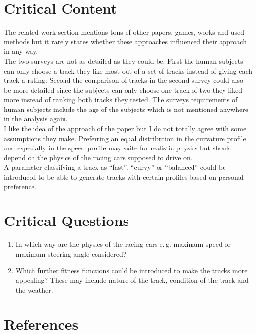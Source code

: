 \documentclass[oneside, notitlepage, twocolumn]{scrartcl}
\newcommand{\eg}{e.\,g. }
\begin{document}
\section{Critical Content}
The related work section mentions tons of other papers, games, works and used methods but it rarely states whether these approaches influenced their approach in any way.\\
The two surveys are not as detailed as they could be.
First the human subjects can only choose a track they like most out of a set of tracks instead of giving each track a rating.
Second the comparison of tracks in the second survey could also be more detailed since the subjects can only choose one track of two they liked more instead of ranking both tracks they tested.
The surveys requirements of human subjects include the age of the subjects which is not mentioned anywhere in the analysis again.\\
I like the idea of the approach of the paper but I do not totally agree with some assumptions they make.
Preferring an equal distribution in the curvature profile and especially in the speed profile may suite for realistic physics but should depend on the physics of the racing cars supposed to drive on.\\
A parameter classifying a track as ``fast'', ``curvy'' or ``balanced'' could be introduced to be able to generate tracks with certain profiles based on personal preference.

\section{Critical Questions}
\begin{enumerate}
    \item In which way are the physics of the racing cars \eg maximum speed or maximum steering angle considered?
    \item Which further fitness functions could be introduced to make the tracks more appealing? These may include nature of the track, condition of the track and the weather.
\end{enumerate}

\section{References}
\begingroup
\renewcommand{\section}[2]{}%
\nocite{*}
\printbibliography%
\endgroup
\end{document}
